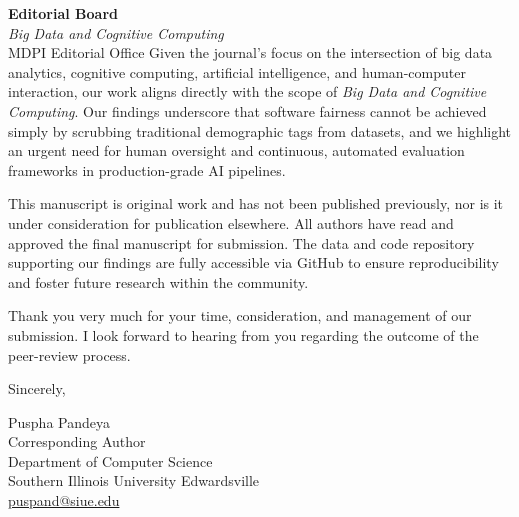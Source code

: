 \documentclass[11pt,a4paper]{letter}
\begin{document}
\begin{letter}{
    \textbf{Editorial Board} \\
    \textit{Big Data and Cognitive Computing} \\
    MDPI Editorial Office
}
Given the journal's focus on the intersection of big data analytics, cognitive computing, artificial intelligence, and human-computer interaction, our work aligns directly with the scope of \textit{Big Data and Cognitive Computing}. Our findings underscore that software fairness cannot be achieved simply by scrubbing traditional demographic tags from datasets, and we highlight an urgent need for human oversight and continuous, automated evaluation frameworks in production-grade AI pipelines.

This manuscript is original work and has not been published previously, nor is it under consideration for publication elsewhere. All authors have read and approved the final manuscript for submission. The data and code repository supporting our findings are fully accessible via GitHub to ensure reproducibility and foster future research within the community.

Thank you very much for your time, consideration, and management of our submission. I look forward to hearing from you regarding the outcome of the peer-review process.

\closing{Sincerely,}

\vspace{0.5cm}
\noindent Puspha Pandeya \\
Corresponding Author \\
Department of Computer Science \\
Southern Illinois University Edwardsville \\
\href{mailto:puspand@siue.edu}{puspand@siue.edu}

\end{letter}
\end{document}
